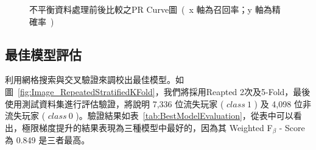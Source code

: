 \begin{figure}[!htb]
    \centering
    \caption[不平衡資料處理前後比較之PR Curve圖]{不平衡資料處理前後比較之PR Curve圖\ (\ x 軸為召回率；y 軸為精確率\ )}
    \label{fig:eva_PRCurveEvaluationImbalancedData}
\end{figure}
\newpage

\subsection{最佳模型評估}
\label{subsec:BestModelEvaluation}

利用網格搜索與交叉驗證來調校出最佳模型。如圖~\ref{fig:Image_RepeatedStratifiedKFold}，我們將採用Reapted 2次及5-Fold，最後使用測試資料集進行評估驗證，將說明 7,336 位流失玩家 ( $class\ 1$ ) 及 4,098 位非流失玩家 ( $class\ 0$ )。驗證結果如表~\ref{tab:BestModelEvaluation}，從表中可以看出，極限梯度提升的結果表現為三種模型中最好的，因為其 Weighted F$_{\beta}$ - Score 為 0.849 是三者最高。

